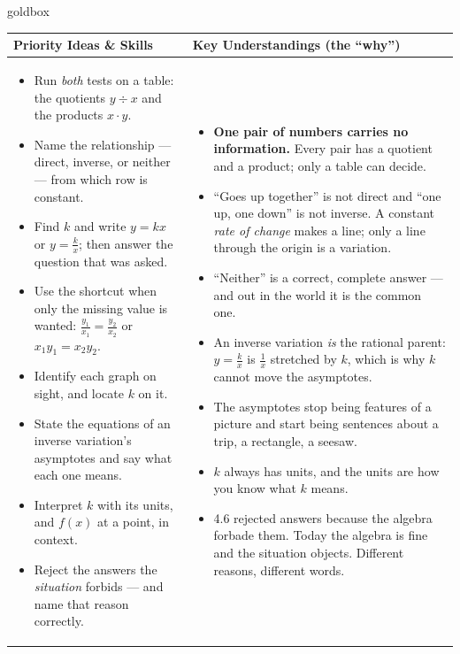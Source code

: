 \documentclass[10pt]{article}
\begin{document}
\renewcommand{\arraystretch}{1.4}
\begin{skillbox}{goldbox}
\begin{tabularx}{\linewidth}{@{}X|X@{}}
\textbf{Priority Ideas \& Skills} & \textbf{Key Understandings (the ``why'')} \\[2pt]
\hline
\vspace{-6pt}
\begin{itemize}[leftmargin=1.1em, nosep, after=\vspace{2pt}]
  \item Run \emph{both} tests on a table: the quotients $y\div x$ and the products $x\cdot y$.
  \item Name the relationship --- direct, inverse, or neither --- from which row is constant.
  \item Find $k$ and write $y=kx$ or $y=\frac kx$; then answer the question that was asked.
  \item Use the shortcut when only the missing value is wanted: $\frac{y_1}{x_1}=\frac{y_2}{x_2}$ or $x_1y_1=x_2y_2$.
  \item Identify each graph on sight, and locate $k$ on it.
  \item State the equations of an inverse variation's asymptotes and say what each one means.
  \item Interpret $k$ with its units, and $f(x)$ at a point, in context.
  \item Reject the answers the \emph{situation} forbids --- and name that reason correctly.
\end{itemize}
&
\vspace{-6pt}
\begin{itemize}[leftmargin=1.1em, nosep, after=\vspace{2pt}]
  \item \textbf{One pair of numbers carries no information.} Every pair has a quotient and a product; only a table can decide.
  \item ``Goes up together'' is not direct and ``one up, one down'' is not inverse. A constant \emph{rate of change} makes a line; only a line through the origin is a variation.
  \item ``Neither'' is a correct, complete answer --- and out in the world it is the common one.
  \item An inverse variation \emph{is} the rational parent: $y=\frac kx$ is $\frac1x$ stretched by $k$, which is why $k$ cannot move the asymptotes.
  \item The asymptotes stop being features of a picture and start being sentences about a trip, a rectangle, a seesaw.
  \item $k$ always has units, and the units are how you know what $k$ means.
  \item 4.6 rejected answers because the algebra forbade them. Today the algebra is fine and the situation objects. Different reasons, different words.
\end{itemize}
\end{tabularx}
\end{skillbox}
\end{document}
